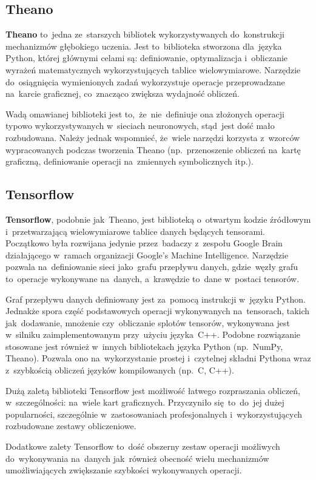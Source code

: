 \subsection{Theano}
\textbf{Theano} to~jedna ze~starszych bibliotek wykorzystywanych do~konstrukcji mechanizmów głębokiego uczenia.
Jest to~biblioteka stworzona dla~języka Python, której głównymi celami są: definiowanie, optymalizacja i~obliczanie
wyrażeń matematycznych wykorzystujących tablice wielowymiarowe. Narzędzie do~osiągnięcia wymienionych zadań wykorzystuje
operacje przeprowadzane na~karcie graficznej, co~znacząco zwiększa wydajność obliczeń.

Wadą omawianej biblioteki jest to,~że~nie~definiuje ona złożonych operacji typowo wykorzystywanych w~sieciach
neuronowych, stąd~jest dość mało rozbudowana. Należy jednak wspomnieć, że~wiele narzędzi korzysta z~wzorców
wypracowanych podczas tworzenia Theano (np.~przenoszenie obliczeń na~kartę graficzną, definiowanie operacji na~zmiennych
symbolicznych itp.).

\subsection{Tensorflow}
\textbf{Tensorflow}, podobnie jak~Theano, jest biblioteką o~otwartym kodzie źródłowym i~przetwarzającą wielowymiarowe
tablice danych będących tensorami. Początkowo była rozwijana jedynie przez~badaczy z~zespołu Google Brain działającego
w~ramach organizacji Google's Machine Intelligence. Narzędzie pozwala na~definiowanie sieci jako~grafu przepływu
danych, gdzie~węzły grafu to~operacje wykonywane na~danych, a~krawędzie to~dane w~postaci tensorów.

Graf przepływu danych definiowany jest za~pomocą instrukcji w~języku Python. Jednakże spora część podstawowych
operacji wykonywanych na~tensorach, takich jak~dodawanie, mnożenie czy~obliczanie splotów tensorów, wykonywana jest
w~silniku zaimplementowanym przy~użyciu języka~C++. Podobne rozwiązanie stosowane jest również w~innych bibliotekach
języka Python (np.~NumPy, Theano). Pozwala ono na~wykorzystanie prostej i~czytelnej składni Pythona wraz z~szybkością
obliczeń języków kompilowanych (np.~C, C++).

Dużą zaletą biblioteki Tensorflow jest możliwość łatwego rozpraszania obliczeń, w~szczególności: na~wiele kart
graficznych. Przyczyniło się~to~do~jej dużej popularności, szczególnie w~zastosowaniach profesjonalnych
i~wykorzystujących rozbudowane zestawy obliczeniowe.

Dodatkowe zalety Tensorflow to~dość obszerny zestaw operacji możliwych do~wykonywania na~danych jak~również
obecność wielu mechanizmów umożliwiających zwiększanie szybkości wykonywanych operacji.


